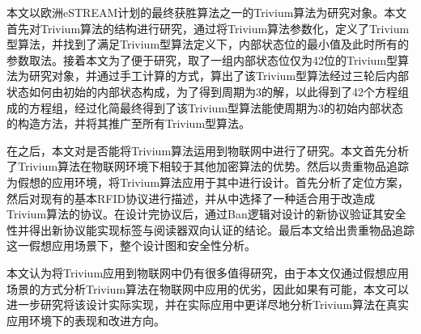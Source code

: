 
\begin{summary}
本文以欧洲eSTREAM计划的最终获胜算法之一的Trivium算法为研究对象。本文首先对Trivium算法的结构进行研究，通过将Trivium算法参数化，定义了Trivium型算法，并找到了满足Trivium型算法定义下，内部状态位的最小值及此时所有的参数取法。接着本文为了便于研究，取了一组内部状态位仅为42位的Trivium型算法为研究对象，并通过手工计算的方式，算出了该Trivium型算法经过三轮后内部状态如何由初始的内部状态构成，为了得到周期为3的解，以此得到了42个方程组成的方程组，经过化简最终得到了该Trivium型算法能使周期为3的初始内部状态的构造方法，并将其推广至所有Trivium型算法。

在之后，本文对是否能将Trivium算法运用到物联网中进行了研究。本文首先分析了Trivium算法在物联网环境下相较于其他加密算法的优势。然后以贵重物品追踪为假想的应用环境，将Trivium算法应用于其中进行设计。首先分析了定位方案，然后对现有的基本RFID协议进行描述，并从中选择了一种适合用于改造成Trivium算法的协议。在设计完协议后，通过Ban逻辑对设计的新协议验证其安全性并得出新协议能实现标签与阅读器双向认证的结论。最后本文给出贵重物品追踪这一假想应用场景下，整个设计图和安全性分析。

本文认为将Trivium应用到物联网中仍有很多值得研究，由于本文仅通过假想应用场景的方式分析Trivium算法在物联网中应用的优劣，因此如果有可能，本文可以进一步研究将该设计实际实现，并在实际应用中更详尽地分析Trivium算法在真实应用环境下的表现和改进方向。

\end{summary}
